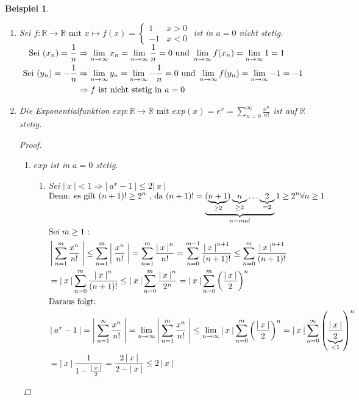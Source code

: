 \documentclass[a4paper,titlepage,oneside]{article}
\def\R{\ensuremath{\mathbb{R}} }
\newcommand{\suminf}[2][n]{\ensuremath{\sum_{#1= 0}^{\infty}{#2}}}
\newcommand{\Suminf}[2][n]{\ensuremath{\sum_{#1=1}^{\infty}{#2}}}
\renewcommand{\liminf}[2][n]{\ensuremath{\lim\limits_{#1 \rightarrow \infty}{#2}}}
\newcommand{\abs}[1]{\ensuremath{\left|\:#1\:\right|}}
\theoremstyle{thmstyle}
\newtheorem{bsp}[satz]{Beispiel}
\theoremstyle{subthmstyle}
\begin{document}
\begin{bsp}
\begin{enumerate}
\item Sei $f : \R \to \R \text{ mit } x \mapsto f(x) = \begin{cases} 1 & x > 0 \\ -1 & x < 0\end{cases}$ ist in $a = 0$ nicht stetig.\\ %
\begin{math}\displaystyle \vphantom{\frac{1}{n}}\begin{aligned}[t]
\text{Sei } (x_n) = \frac{1}{n} &\Rightarrow \liminf{x_n} = \liminf{\frac{1}{n}} = 0 \text{ und } \liminf{f(x_n)} = \liminf{1} = 1 \\
\text{ Sei } (y_n) = -\frac{1}{n} &\Rightarrow \liminf{y_n} = \liminf{-\frac{1}{n}} = 0 \text{ und } \liminf{f(y_n)} = \liminf{-1} = -1 \\
&\Rightarrow f \text{ ist nicht stetig in } a = 0
\end{aligned}\end{math} 

\item Die Exponentialfunktion $exp : \R \to \R \text{ mit } exp(x) = e^x = \suminf{\frac{x^n}{n!}} $ ist auf \R stetig.
\begin{proof}
\begin{enumerate}
\item $exp$ ist in $a = 0$ stetig.
\begin{enumerate}[label=\roman*)]
  \item Sei $\abs{x} < 1 \Rightarrow \abs{a^x - 1} \le 2 \abs{x}$\\
  \begin{math}\displaystyle \begin{aligned}[t]
  &\text{Denn: es gilt } (n+1)! \ge 2^n \text{ , da } (n+1)! = \underbrace{(\underbrace{n+1}_{\ge2})\underbrace{n}_{\ge2}\dots\underbrace{2}_{=2}}_{n-mal}1 \ge 2^n \forall n \ge 1 \vphantom{\underbrace{\underbrace{2}_{2}}_{2}} \\
  &\text{Sei } m \ge 1 \text{ : } \\
  &\abs{\sum_{n=1}^{m}{\frac{x^n}{n!}}} \le \sum_{n=1}^{m}{\abs{\frac{x^n}{n!}}} = \sum_{n=1}^{m}{\frac{\abs{x}^n}{n!}}
  = \sum_{n= 0}^{m-1}{\frac{\abs{x}^{n+1}}{(n+1)!}} \le \sum_{n= 0}^{m}{\frac{\abs{x}^{n+1}}{(n+1)!}} \\
  &= \abs{x}\sum_{n= 0}^{m}{\frac{\abs{x}^{n}}{(n+1)!}} \le \abs{x}\sum_{n= 0}^{m}{\frac{\abs{x}^{n}}{2^n}}
  = \abs{x}\sum_{n= 0}^{m}{\left(\frac{\abs{x}}{2}\right)^n} \\
  &\text{Daraus folgt: } \\
  &\abs{a^x - 1} = \abs{\Suminf{\frac{x^n}{n!}}} = \liminf{\abs{\sum_{n=1}^{m}{\frac{x^n}{n!}}}}
  \le \liminf{\abs{x}\sum_{n=0}^{m}{\left(\frac{\abs{x}}{2}\right)^n}} = \abs{x}\suminf{\left(\underbrace{\frac{\abs{x}}{2}}_{< 1}\right)^n} \\
  &= \abs{x}\frac{1}{1-\frac{\abs{x}}{2}} = \frac{2\abs{x}}{2-\abs{x}} \le 2\abs{x}
  \end{aligned}\end{math} 


\end{enumerate}
\end{enumerate}
\end{proof}
\end{enumerate}
\end{bsp}
\end{document}
